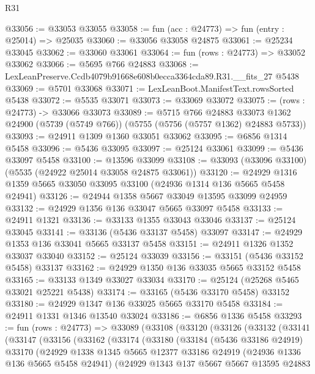 \begin{lexlean}{R31}
\begin{coremodule}
@33056 := @33053 @33055
@33058 := fun (acc : @24773) => fun (entry : @25014) => @25035
@33060 := @33056 @33058 @24875
@33061 := @25234 @33045
@33062 := @33060 @33061
@33064 := fun (rows : @24773) => @33052 @33062
@33066 := @5695 @766 @24883
@33068 := LexLeanPreserve.Ccdb4079b91668e608b0ecca3364cda89.R31.__fits_27 @5438
@33069 := @5701 @33068
@33071 := LexLeanBoot.ManifestText.rowsSorted @5438
@33072 := @5535 @33071
@33073 := @33069 @33072
@33075 := (rows : @24773) -> @33066 @33073
@33089 := @5715
    @766
    @24883
    @33073
    @1362
    @24900
    (@5739 (@5749 @766))
    (@5755 (@5756 (@5757 @1362) @24883 @5733))
@33093 := @24911 @1309 @1360 @33051 @33062
@33095 := @6856 @1314 @5458
@33096 := @5436 @33095
@33097 := @25124 @33061
@33099 := @5436 @33097 @5458
@33100 := @13596 @33099
@33108 := @33093 (@33096 @33100) (@5535 (@24922 @25014 @33058 @24875 @33061))
@33120 := @24929 @1316 @1359 @5665 @33050 @33095 @33100 (@24936 @1314 @136 @5665 @5458 @24941)
@33126 := @24944 @1358 @5667 @33049 @13595 @33099 @24959
@33132 := @24929 @1356 @136 @33047 @5665 @33097 @5458
@33133 := @24911 @1321
@33136 := @33133 @1355 @33043 @33046
@33137 := @25124 @33045
@33141 := @33136 (@5436 @33137 @5458) @33097
@33147 := @24929 @1353 @136 @33041 @5665 @33137 @5458
@33151 := @24911 @1326 @1352 @33037 @33040
@33152 := @25124 @33039
@33156 := @33151 (@5436 @33152 @5458) @33137
@33162 := @24929 @1350 @136 @33035 @5665 @33152 @5458
@33165 := @33133 @1349 @33027 @33034
@33170 := @25124 (@25268 @5465 @33021 @25221 @5438)
@33174 := @33165 (@5436 @33170 @5458) @33152
@33180 := @24929 @1347 @136 @33025 @5665 @33170 @5458
@33184 := @24911 @1331 @1346 @13540 @33024
@33186 := @6856 @1336 @5458
@33293 := fun (rows : @24773) =>
  @33089
    (@33108
      (@33120
        (@33126
          (@33132
            (@33141
              (@33147
                (@33156
                  (@33162
                    (@33174
                      (@33180
                        (@33184
                          (@5436 @33186 @24919)
                          @33170
                          (@24929
                            @1338
                            @1345
                            @5665
                            @12377
                            @33186
                            @24919
                            (@24936 @1336 @136 @5665 @5458 @24941)
                            (@24929
                              @1343
                              @137
                              @5667
                              @5667
                              @13595
                              @24883

\end{coremodule}
\end{lexlean}
